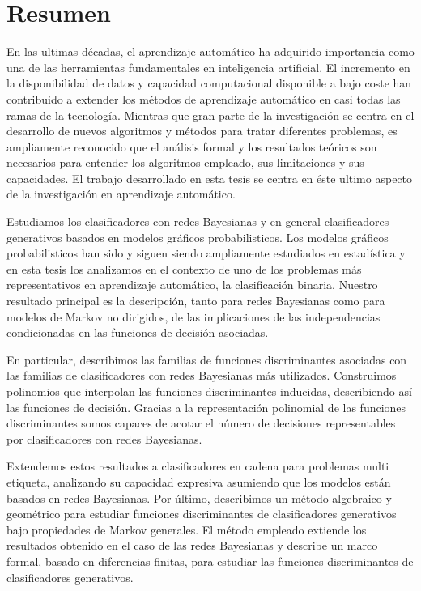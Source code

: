 \documentclass[11pt,a4paper, twoside]{book}
\begin{document}
   

\newpage 
\cleardoublepage

\section*{Resumen}

En las ultimas décadas, el aprendizaje automático ha adquirido importancia como una de las herramientas fundamentales en inteligencia artificial. El incremento en la disponibilidad de datos y capacidad computacional disponible a bajo coste han contribuido a extender los métodos de aprendizaje automático en casi todas las ramas de la tecnología. 
Mientras que gran parte de la investigación se centra en el desarrollo de nuevos algoritmos y métodos para tratar diferentes problemas, es ampliamente reconocido que el análisis formal y los resultados teóricos son necesarios para entender los algoritmos empleado, sus limitaciones y sus capacidades.
El trabajo desarrollado en esta tesis se centra en éste ultimo aspecto de la investigación en aprendizaje automático.

Estudiamos los clasificadores con redes Bayesianas y en general clasificadores generativos basados en modelos gráficos probabilisticos. Los modelos gráficos probabilisticos han sido y siguen siendo ampliamente estudiados en estadística y en esta tesis los analizamos en el contexto de uno de los problemas más representativos en aprendizaje automático, la clasificación binaria.
Nuestro resultado principal es la descripción, tanto para redes Bayesianas como para modelos de Markov no dirigidos, de las implicaciones de las independencias condicionadas en las funciones de decisión asociadas.

En particular, describimos las familias de funciones discriminantes asociadas con las familias de clasificadores con redes Bayesianas más utilizados.
Construimos polinomios que interpolan las funciones discriminantes inducidas, describiendo así las funciones de decisión. Gracias a la representación polinomial de las funciones discriminantes somos capaces de acotar el número de decisiones representables por clasificadores con redes Bayesianas.

Extendemos estos resultados a clasificadores en cadena para problemas multi etiqueta, analizando su capacidad expresiva asumiendo que los modelos están basados en redes Bayesianas.
Por último, describimos un método algebraico y geométrico para estudiar funciones discriminantes  de clasificadores generativos bajo propiedades de Markov generales. El método empleado extiende los resultados obtenido en el caso de las redes Bayesianas y describe un marco formal, basado en diferencias finitas, para estudiar las funciones discriminantes de clasificadores generativos.
\end{document}
